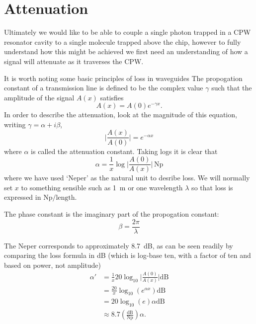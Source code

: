 \documentclass[a4paper]{article}
\begin{document}


\section{Attenuation}

Ultimately we would like to be able to couple a single photon trapped in a CPW
resonator cavity to a single molecule trapped above the chip, however to fully
understand how this might be achieved we first need an understanding of how a
signal will attenuate as it traverses the CPW.

It is worth noting some basic principles of loss in waveguides\cite{Collin2007}
The propogation constant of a transmission line is defined to be the complex
value $\gamma$ such that the amplitude of the signal $A(x)$ satisfies
\begin{equation}
  A(x) = A(0)e^{-\gamma x}.
\end{equation}
In order to describe the attenuation, look at the magnitude of this equation,
writing $\gamma = \alpha +i\beta$,
\begin{equation}
  \lvert\frac{A(x)}{A(0)}\rvert = e^{-\alpha x}
\end{equation}
where $\alpha$ is called the attenuation constant. Taking logs it is clear that
\begin{equation}
  \alpha = \frac{1}{x}\log\lvert\frac{A(0)}{A(x)}\rvert\,\si{\neper}
\end{equation}
where we have used `Neper' as the natural unit to desribe loss. We will normally
set $x$ to something sensible such as \SI{1}{\meter} or one wavelength $\lambda$
so that loss is expressed in $\si{\neper}/\mathrm{length}$.

The phase constant is the imaginary part of the propogation constant:
\begin{equation}
  \beta = \frac{2\pi}{\lambda}
\end{equation}

The Neper corresponds to approximately \SI{8.7}{\dB}, as can be seen readily by
comparing the loss formula in dB (which is log-base ten, with a factor of ten
and based on power, not amplitude)
\begin{align*}
  \alpha' &= \frac{1}{x}20\log_{10}\lvert \frac{A(0)}{A(x)} \rvert \si{\dB}\\
          &= \frac{20}{x}\log_{10}(e^{\alpha x}) \si{\dB} \\
          &= 20 \log_{10}(e) \alpha \si{\dB} \\
          &\approx 8.7 \left(\frac{\si{\dB}}{\si{\neper}}\right) \alpha.
\end{align*}
\end{document}
